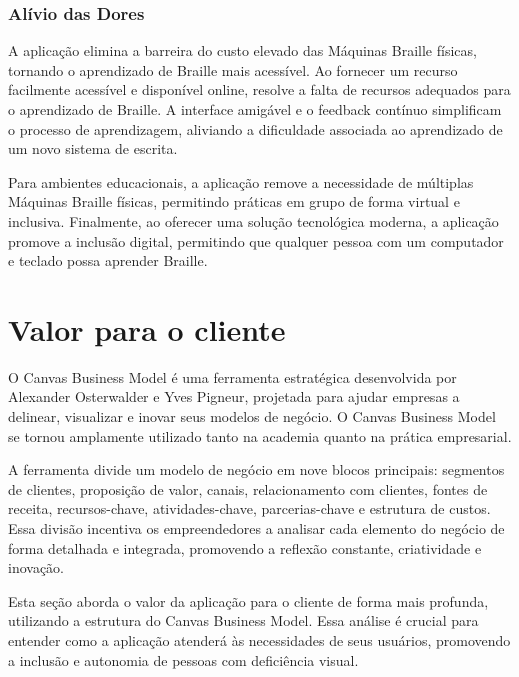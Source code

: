 \subsubsection{Alívio das Dores}

A aplicação elimina a barreira do custo elevado das Máquinas Braille físicas, tornando o aprendizado de Braille mais acessível. Ao fornecer um recurso facilmente acessível e disponível online, resolve a falta de recursos adequados para o aprendizado de Braille. A interface amigável e o feedback contínuo simplificam o processo de aprendizagem, aliviando a dificuldade associada ao aprendizado de um novo sistema de escrita. 

Para ambientes educacionais, a aplicação remove a necessidade de múltiplas Máquinas Braille físicas, permitindo práticas em grupo de forma virtual e inclusiva. Finalmente, ao oferecer uma solução tecnológica moderna, a aplicação promove a inclusão digital, permitindo que qualquer pessoa com um computador e teclado possa aprender Braille.

\section{Valor para o cliente}

O Canvas Business Model é uma ferramenta estratégica desenvolvida por Alexander Osterwalder e Yves Pigneur, projetada para ajudar empresas a delinear, visualizar e inovar seus modelos de negócio. O Canvas Business Model se tornou amplamente utilizado tanto na academia quanto na prática empresarial. 

A ferramenta divide um modelo de negócio em nove blocos principais: segmentos de clientes, proposição de valor, canais, relacionamento com clientes, fontes de receita, recursos-chave, atividades-chave, parcerias-chave e estrutura de custos. Essa divisão incentiva os empreendedores a analisar cada elemento do negócio de forma detalhada e integrada, promovendo a reflexão constante, criatividade e inovação. 

Esta seção aborda o valor da aplicação para o cliente de forma mais profunda, utilizando a estrutura do Canvas Business Model. Essa análise  é crucial para entender como a aplicação atenderá às necessidades de seus usuários, promovendo a inclusão e autonomia de pessoas com deficiência visual.


